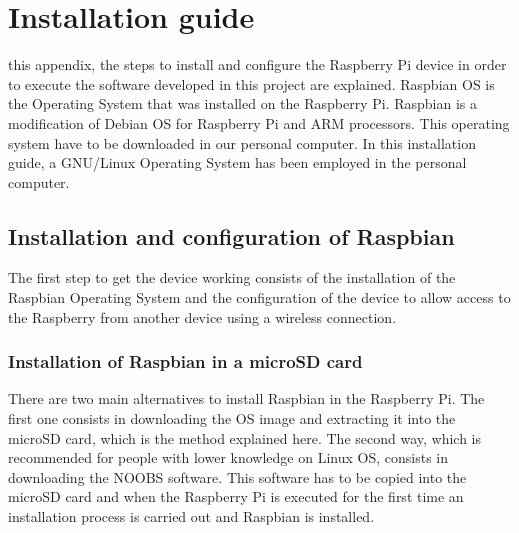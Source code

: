 
\chapter{Installation guide}
\label{chap:installation_guide}

 this appendix, the steps to install and configure the Raspberry Pi device in order to execute the software developed in this project are explained. Raspbian \ac{OS} \cite{Raspbian} is the Operating System that was installed on the Raspberry Pi. Raspbian is a modification of Debian \ac{OS} for Raspberry Pi and ARM processors. This operating system have to be downloaded in our personal computer. In this installation guide, a GNU/Linux Operating System has been employed in the personal computer.


\section{Installation and configuration of Raspbian}
\label{chap:installation_raspbian}
The first step to get the device working consists of the installation of the Raspbian Operating System and the configuration of the device to allow access to the Raspberry from another device using a wireless connection.

\subsection{Installation of Raspbian in a microSD card}
There are two main alternatives to install Raspbian in the Raspberry Pi. The first one consists in downloading the \ac{OS} image and extracting it into the microSD card, which is the method explained here. The second way, which is recommended for people with lower knowledge on Linux \ac{OS}, consists in downloading the NOOBS software. This software has to be copied into the microSD card and when the Raspberry Pi is executed for the first time an installation process is carried out and Raspbian is installed. 

